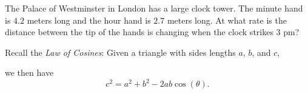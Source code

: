 \documentclass{ximera}
\begin{document}
\begin{example}
  The Palace of Westminster in London has a large clock tower.  The
  minute hand is $4.2$ meters long and the hour hand is $2.7$ meters
  long. At what rate is the distance between the tip of the hands is
  changing when the clock strikes $3$ pm?
  \begin{hint}
  Recall the \textit{Law of Cosines}: Given a triangle with sides
  lengths $a$, $b$, and $c$,
  \begin{image}
  \end{image}
  we then have
  \[
  c^2 = a^2 + b^2 -2ab\cos(\theta).
  \]
  \end{hint}


\end{example}
\end{document}
